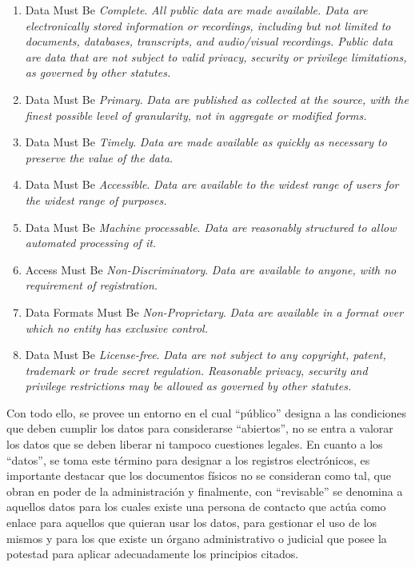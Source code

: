 \begin{enumerate}
 \item Data Must Be \textit{Complete}. \textit{All public data are made available. Data are electronically stored information or recordings, including but not limited to documents, databases, transcripts, and audio/visual recordings. Public data are data that are not subject to valid privacy, security or privilege limitations, as governed by other statutes.}
 \item Data Must Be \textit{Primary}. \textit{Data are published as collected at the source, with the finest possible level of granularity, not in aggregate or modified forms.}
 \item Data Must Be \textit{Timely}. \textit{Data are made available as quickly as necessary to preserve the value of the data.}
 \item Data Must Be \textit{Accessible}. \textit{Data are available to the widest range of users for the widest range of purposes.}
 \item Data Must Be \textit{Machine processable}. \textit{Data are reasonably structured to allow automated processing of it.}
 \item Access Must Be \textit{Non-Discriminatory}. \textit{Data are available to anyone, with no requirement of registration.}
 \item Data Formats Must Be \textit{Non-Proprietary}. \textit{Data are available in a format over which no entity has exclusive control.}
 \item Data Must Be \textit{License-free}. \textit{Data are not subject to any copyright, patent, trademark or trade secret regulation. Reasonable privacy, security and privilege restrictions may be allowed as governed by other statutes.}
\end{enumerate}

Con todo ello, se provee un entorno en el cual ``público'' designa a las condiciones que deben cumplir los datos
para considerarse ``abiertos'', no se entra a valorar los datos que se deben liberar ni tampoco cuestiones
legales. En cuanto a los ``datos'', se toma este término para designar a los registros electrónicos, es importante
destacar que los documentos físicos no se consideran como tal, que obran en poder de la administración y finalmente,
con ``revisable'' se denomina a aquellos datos para los cuales existe una persona de contacto que actúa como
enlace para aquellos que quieran usar los datos, para gestionar el uso de los mismos y para los que 
existe un órgano administrativo o judicial que posee la potestad para aplicar adecuadamente los principios citados.

